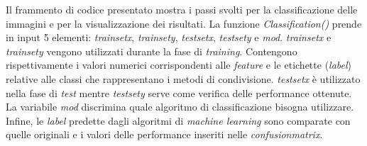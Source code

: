 Il frammento di codice presentato mostra i passi svolti per la classificazione delle immagini e per la visualizzazione dei risultati. La funzione \textit{Classification()} prende in input 5 elementi: \textit{train\textunderscore set\textunderscore x}, \textit{train\textunderscore set\textunderscore y}, \textit{test\textunderscore set\textunderscore x}, \textit{test\textunderscore set\textunderscore y} e \textit{mod}. \textit{train\textunderscore set\textunderscore x} e \textit{train\textunderscore set\textunderscore y} vengono utilizzati durante la fase di \textit{training}. Contengono rispettivamente i valori numerici corrispondenti alle \textit{feature} e le etichette (\textit{label}) relative alle classi che rappresentano i metodi di condivisione. \textit{test\textunderscore set\textunderscore x} è utilizzato nella fase di \textit{test} mentre \textit{test\textunderscore set\textunderscore y} serve come verifica delle performance ottenute. La variabile \textit{mod} discrimina quale algoritmo di classificazione bisogna utilizzare. Infine, le \textit{label} predette dagli algoritmi di \textit{machine learning} sono comparate con quelle originali e i valori delle performance inseriti nelle \textit{confusion\textunderscore matrix}.


